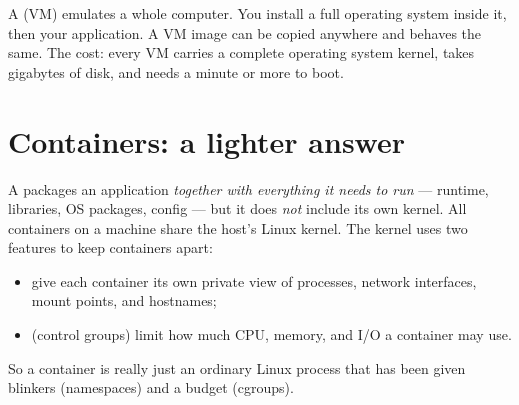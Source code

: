 A  (VM) emulates a whole computer. You install a full
operating system inside it, then your application. A VM image can be copied
anywhere and behaves the same. The cost: every VM carries a complete operating
system kernel, takes gigabytes of disk, and needs a minute or more to boot.

\section{Containers: a lighter answer}

A  packages an application \emph{together with everything it
needs to run} --- runtime, libraries, OS packages, config --- but it does
\emph{not} include its own kernel. All containers on a machine share the host's
Linux kernel. The kernel uses two features to keep containers apart:

\begin{itemize}
  \item {} give each container its own private view of
        processes, network interfaces, mount points, and hostnames;
  \item {} (control groups) limit how much CPU, memory, and I/O a
        container may use.
\end{itemize}

So a container is really just an ordinary Linux process that has been given
blinkers (namespaces) and a budget (cgroups).

